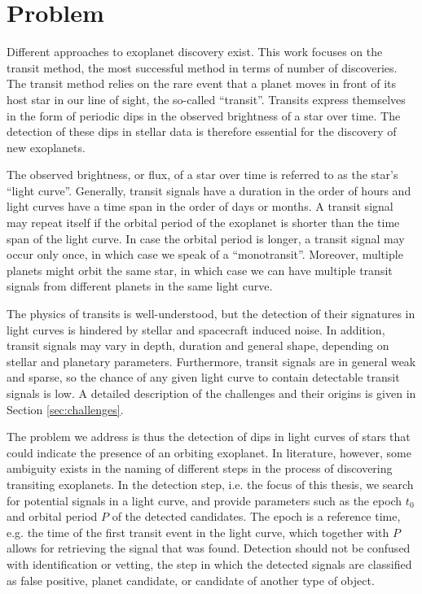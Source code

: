 
\section{Problem}
\label{sec:problem}

Different approaches to exoplanet discovery exist. This work focuses on the transit method, the most successful method in terms of number of discoveries. The transit method relies on the rare event that a planet moves in front of its host star in our line of sight, the so-called ``transit''. Transits express themselves in the form of periodic dips in the observed brightness of a star over time. The detection of these dips in stellar data is therefore essential for the discovery of new exoplanets. 

The observed brightness, or flux, of a star over time is referred to as the star's ``light curve''. Generally, transit signals have a duration in the order of hours and light curves have a time span in the order of days or months. A transit signal may repeat itself if the orbital period of the exoplanet is shorter than the time span of the light curve.
In case the orbital period is longer, a transit signal may occur only once, in which case we speak of a ``monotransit''. 
Moreover, multiple planets might orbit the same star, in which case we can have multiple transit signals from different planets in the same light curve.

The physics of transits is well-understood, but the detection of their signatures in light curves is hindered by stellar and spacecraft induced noise. 
In addition, transit signals may vary in depth, duration and general shape, depending on stellar and planetary parameters.
Furthermore, transit signals are in general weak and sparse, so the chance of any given light curve to contain detectable transit signals is low. A detailed description of the challenges and their origins is given in Section \ref{sec:challenges}.

The problem we address is thus the detection of dips in light curves of stars that could indicate the presence of an orbiting exoplanet. In literature, however, some ambiguity exists in the naming of different steps in the process of discovering transiting exoplanets. In the detection step, i.e. the focus of this thesis, we search for potential signals in a light curve, and provide parameters such as the epoch $t_0$ and orbital period $P$ of the detected candidates. The epoch is a reference time, e.g. the time of the first transit event in the light curve, which together with $P$ allows for retrieving the signal that was found. Detection should not be confused with identification or vetting, the step in which the detected signals are classified as false positive, planet candidate, or candidate of another type of object.
